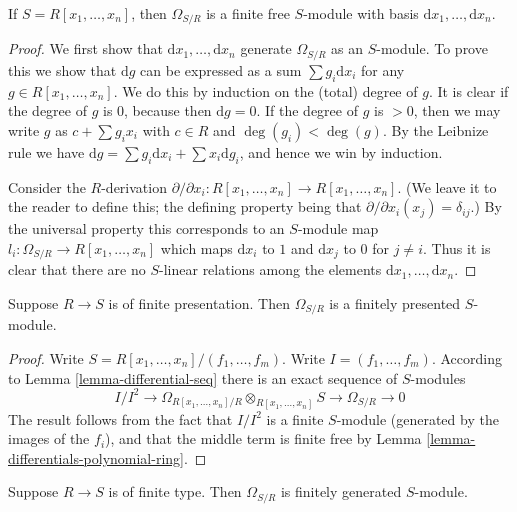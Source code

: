 \begin{lemma}
\label{lemma-differentials-polynomial-ring}
If $S = R[x_1, \ldots, x_n]$, then
$\Omega_{S/R}$ is a finite free $S$-module with
basis $\text{d}x_1, \ldots, \text{d}x_n$.
\end{lemma}

\begin{proof}
We first show that $\text{d}x_1, \ldots, \text{d}x_n$
generate $\Omega_{S/R}$ as an $S$-module. To prove this
we show that $\text{d}g$ can be expressed as a
sum $\sum g_i \text{d}x_i$ for any $g \in R[x_1, \ldots, x_n]$.
We do this by induction on the (total) degree of $g$.
It is clear if the degree of $g$ is $0$, because then
$\text{d}g = 0$. If the degree of $g$ is $>0$, then
we may write $g$ as $c + \sum g_i x_i$ with $c\in R$
and $\deg(g_i) < \deg(g)$. By the Leibnize rule we have
$\text{d}g = \sum g_i \text{d} x_i + \sum x_i \text{d}g_i$,
and hence we win by induction.

\medskip\noindent
Consider the $R$-derivation $\partial / \partial x_i :
R[x_1, \ldots, x_n] \to R[x_1, \ldots, x_n]$. (We leave it to
the reader to define this; the defining property
being that $\partial / \partial x_i (x_j) = \delta_{ij}$.)
By the universal property this corresponds to an $S$-module map $l_i :
\Omega_{S/R} \to R[x_1, \ldots, x_n]$ which maps $\text{d}x_i$
to $1$ and $\text{d}x_j$ to $0$ for $j \not= i$.
Thus it is clear that there are no $S$-linear relations
among the elements $\text{d}x_1, \ldots, \text{d}x_n$.
\end{proof}

\begin{lemma}
\label{lemma-differentials-finitely-presented}
Suppose $R \to S$ is of finite presentation.
Then $\Omega_{S/R}$ is a finitely presented
$S$-module.
\end{lemma}

\begin{proof}
Write $S = R[x_1, \ldots, x_n]/(f_1, \ldots, f_m)$.
Write $I = (f_1, \ldots, f_m)$. According
to Lemma \ref{lemma-differential-seq} there is an exact sequence
of $S$-modules
$$
I/I^2
\to
\Omega_{R[x_1, \ldots, x_n]/R}\otimes_{R[x_1, \ldots, x_n]} S
\to
\Omega_{S/R}
\to
0
$$
The result follows from the fact that $I/I^2$ is a finite
$S$-module (generated by the images of the $f_i$), and that
the middle term is finite free by
Lemma \ref{lemma-differentials-polynomial-ring}.
\end{proof}

\begin{lemma}
\label{lemma-differentials-finitely-generated}
Suppose $R \to S$ is of finite type.
Then $\Omega_{S/R}$ is finitely generated
$S$-module.
\end{lemma}

